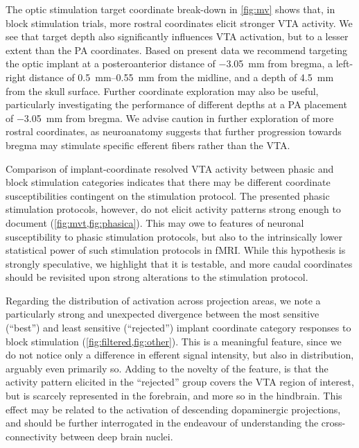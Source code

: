 The optic stimulation target coordinate break-down in \cref{fig:mv} shows that, in block stimulation trials, more rostral coordinates elicit stronger VTA activity.
We see that target depth also significantly influences VTA activation, but to a lesser extent than the PA coordinates.
Based on present data we recommend targeting the optic implant at
a posteroanterior distance of \SI{-3.05}{\milli\meter} from bregma,
a left-right distance of \SIrange{0.5}{0.55}{\milli\meter} from the midline,
and a depth of \SI{4.5}{\milli\meter} from the skull surface.
Further coordinate exploration may also be useful, particularly investigating the performance of different depths at a PA placement of \SI{-3.05}{\milli\meter} from bregma.
We advise caution in further exploration of more rostral coordinates, as neuroanatomy suggests that further progression towards bregma may stimulate specific efferent fibers rather than the VTA.

Comparison of implant-coordinate resolved VTA activity between phasic and block stimulation categories indicates that there may be different coordinate susceptibilities contingent on the stimulation protocol.
The presented phasic stimulation protocols, however, do not elicit activity patterns strong enough to document (\cref{fig:mvt,fig:phasica}).
This may owe to features of neuronal susceptibility to phasic stimulation protocols, but also to the intrinsically lower statistical power of such stimulation protocols in fMRI.
While this hypothesis is strongly speculative, we highlight that it is testable, and more caudal coordinates should be revisited upon strong alterations to the stimulation protocol.

Regarding the distribution of activation across projection areas, we note a particularly strong and unexpected divergence between the most sensitive (“best”) and least sensitive (“rejected”) implant coordinate category responses to block stimulation (\cref{fig:filtered,fig:other}).
This is a meaningful feature, since we do not notice only a difference in efferent signal intensity, but also in distribution, arguably even primarily so.
Adding to the novelty of the feature, is that the activity pattern elicited in the “rejected” group covers the VTA region of interest, but is scarcely represented in the forebrain, and more so in the hindbrain.
This effect may be related to the activation of descending dopaminergic projections, and should be further interrogated in the endeavour of understanding the cross-connectivity between deep brain nuclei.

